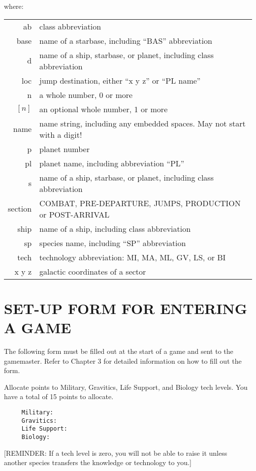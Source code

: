 \documentclass[10pt,titlepage]{article}
\begin{document}
where:

\begin{tabular}{r@{ = }l}
	\noindent ab & class abbreviation \\
	base & name of a starbase, including ``BAS'' abbreviation \\
	d & name of a ship, starbase, or planet, including class abbreviation \\
	loc & jump destination, either ``x y z'' or ``PL name''  \\
	n & a whole number, 0 or more  \\
	$\left[n\right]$ & an optional whole number, 1 or more  \\
	name & name string, including any embedded spaces. May not start with a digit! \\
	p & planet number \\
	pl & planet name, including abbreviation ``PL'' \\
	s & name of a ship, starbase, or planet, including class abbreviation \\
	section & COMBAT, PRE-DEPARTURE, JUMPS, PRODUCTION or POST-ARRIVAL \\
	ship & name of a ship, including class abbreviation \\
	sp & species name, including ``SP'' abbreviation \\
	tech & technology abbreviation: MI, MA, ML, GV, LS, or BI \\
	x y z & galactic coordinates of a sector \\
\end{tabular}


\newpage

\section{SET-UP FORM FOR ENTERING A GAME}

The following form must be filled out at the start of a game and sent to the
gamemaster.  Refer to Chapter 3 for detailed information on how to fill out
the form.

Allocate points to Military, Gravitics, Life Support, and Biology tech levels.
You have a total of 15 points to allocate.

\begin{verbatim}
     Military:
     Gravitics:
     Life Support:
     Biology:\end{verbatim} 

[REMINDER: If a tech level is zero, you will not be able to raise it unless
another species transfers the knowledge or technology to you.]
\end{document}
